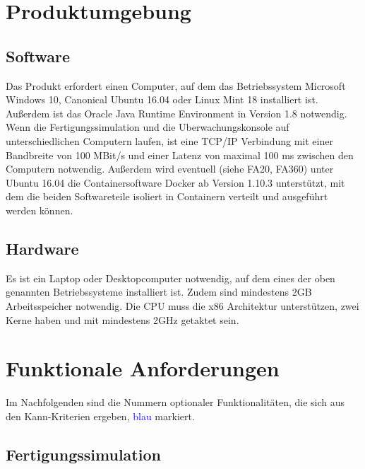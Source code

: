 \documentclass[parskip=full]{scrartcl}
\begin{document}
\pagebreak
\section{Produktumgebung}
\subsection{Software}
Das Produkt erfordert einen Computer, auf dem das Betriebssystem Microsoft Windows 10, Canonical Ubuntu 16.04 oder Linux Mint 18 installiert ist.
Außerdem ist das Oracle Java Runtime Environment in Version 1.8
notwendig. Wenn die \gls{Fertigungssimulation} und die \gls{Uberwachungskonsole} auf unterschiedlichen Computern laufen,
ist eine \gls{TCP/IP} Verbindung mit einer Bandbreite von 100 MBit/s und einer Latenz von maximal 100 ms zwischen den Computern notwendig.
Außerdem wird eventuell (siehe FA20, FA360) unter Ubuntu 16.04 die Containersoftware Docker
ab Version 1.10.3 unterstützt, mit dem die beiden Softwareteile isoliert in Containern verteilt und ausgeführt werden können.

\subsection{Hardware}
\label{Hardware}
Es ist ein Laptop oder Desktopcomputer notwendig, auf dem eines der oben genannten Betriebssysteme installiert ist.
Zudem sind mindestens 2GB Arbeitsspeicher notwendig. Die CPU muss die x86 Architektur unterstützen, zwei Kerne haben und mit
mindestens 2GHz getaktet sein.

\pagebreak
\section{Funktionale Anforderungen}
Im Nachfolgenden sind die Nummern optionaler Funktionalitäten, die sich aus den Kann-Kriterien ergeben, \textcolor{blue}{blau} markiert.

\subsection{Fertigungssimulation}
\end{document}
